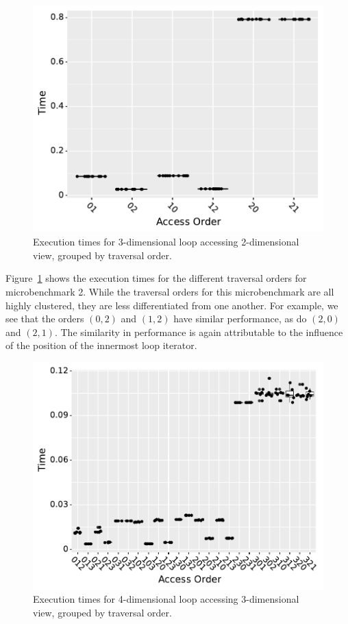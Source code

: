 \documentclass[sigconf, table]{acmart}
\begin{document}
\begin{figure}
  \includegraphics{benchmark2_boxplot.pdf}
  \caption{Execution times for 3-dimensional loop accessing 2-dimensional view, grouped by traversal order.}
  \label{TraversalBenchmark2}
\end{figure}
Figure~\ref{TraversalBenchmark2} shows the execution times for the different traversal orders for microbenchmark 2. 
While the traversal orders for this microbenchmark are all highly clustered, they are less differentiated from one another. 
For example, we see that the orders $(0,2)$ and $(1,2)$ have similar performance, as do $(2,0)$ and $(2,1)$. 
The similarity in performance is again attributable to the influence of the position of the innermost loop iterator. 

\begin{figure}
  \includegraphics{benchmark3_boxplot.pdf}
  \caption{Execution times for 4-dimensional loop accessing 3-dimensional view, grouped by traversal order.}
  \label{TraversalBenchmark3}
\end{figure}
\end{document}
